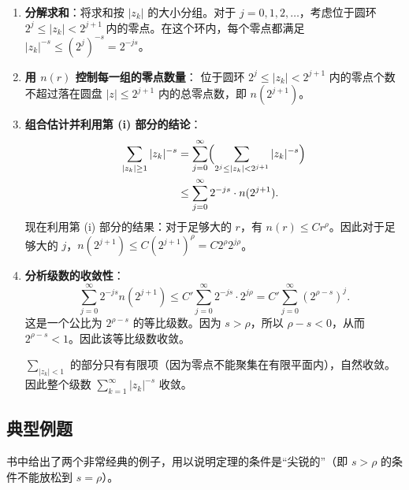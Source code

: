 \documentclass[UTF8]{ctexart}
\numberwithin{equation}{section}
\begin{document}
\begin{enumerate}
\item \textbf{分解求和}：将求和按 \(|z_k|\) 的大小分组。对于 \(j = 0, 1, 2, \dots\)，考虑位于圆环 \(2^j \le |z_k| < 2^{j+1}\) 内的零点。在这个环内，每个零点都满足 \(|z_k|^{-s} \le (2^j)^{-s} = 2^{-js}\)。

\item \textbf{用 \(n(r)\) 控制每一组的零点数量}：
位于圆环 \(2^j \le |z_k| < 2^{j+1}\) 内的零点个数不超过落在圆盘 \(|z| \le 2^{j+1}\) 内的总零点数，即 \(n(2^{j+1})\)。

\item \textbf{组合估计并利用第 (i) 部分的结论}：
\begin{align}
\sum_{|z_k| \ge 1} |z_k|^{-s} 
&= \sum_{j=0}^\infty \Bigl( \sum_{2^j \le |z_k| < 2^{j+1}} |z_k|^{-s} \Bigr) \nonumber\\
&\le \sum_{j=0}^\infty 2^{-js} \cdot n(2^{j+1}).
\end{align}
现在利用第 (i) 部分的结果：对于足够大的 \(r\)，有 \(n(r) \le C r^\rho\)。因此对于足够大的 \(j\)，\(n(2^{j+1}) \le C (2^{j+1})^\rho = C 2^\rho 2^{j\rho}\)。

\item \textbf{分析级数的收敛性}：
\begin{equation}
\sum_{j=0}^\infty 2^{-js} n(2^{j+1}) \le C' \sum_{j=0}^\infty 2^{-js} \cdot 2^{j\rho} = C' \sum_{j=0}^\infty (2^{\rho-s})^j.
\end{equation}
这是一个公比为 \(2^{\rho-s}\) 的等比级数。因为 \(s > \rho\)，所以 \(\rho - s < 0\)，从而 \(2^{\rho-s} < 1\)。因此该等比级数收敛。

\(\sum_{|z_k| < 1}\) 的部分只有有限项（因为零点不能聚集在有限平面内），自然收敛。因此整个级数 \(\sum_{k=1}^\infty |z_k|^{-s}\) 收敛。
\end{enumerate}

\subsection{典型例题}

书中给出了两个非常经典的例子，用以说明定理的条件是“尖锐的”（即 \(s > \rho\) 的条件不能放松到 \(s = \rho\)）。
\end{document}
